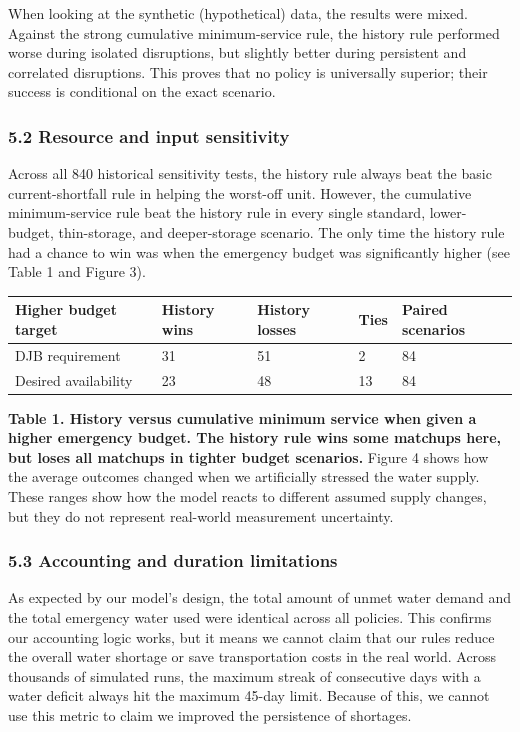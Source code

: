 \documentclass[conference]{IEEEtran}
\begin{document}
When looking at the synthetic (hypothetical) data, the results were mixed. Against the strong cumulative minimum-service rule, the history rule performed worse during isolated disruptions, but slightly better during persistent and correlated disruptions. This proves that no policy is universally superior; their success is conditional on the exact scenario.

\subsubsection{5.2 Resource and input sensitivity}
Across all 840 historical sensitivity tests, the history rule always beat the basic current-shortfall rule in helping the worst-off unit. However, the cumulative minimum-service rule beat the history rule in every single standard, lower-budget, thin-storage, and deeper-storage scenario. The only time the history rule had a chance to win was when the emergency budget was significantly higher (see Table 1 and Figure 3).

\begin{table}[t]
\centering
\begin{tabular}{lllll}
\toprule
Higher budget target & History wins & History losses & Ties & Paired scenarios \\
\midrule
DJB requirement & 31 & 51 & 2 & 84 \\
Desired availability & 23 & 48 & 13 & 84 \\
\bottomrule
\end{tabular}
\end{table}
\textbf{Table 1. History versus cumulative minimum service when given a higher emergency budget. The history rule wins some matchups here, but loses all matchups in tighter budget scenarios.}
Figure 4 shows how the average outcomes changed when we artificially stressed the water supply. These ranges show how the model reacts to different assumed supply changes, but they do not represent real-world measurement uncertainty.

\subsubsection{5.3 Accounting and duration limitations}
As expected by our model's design, the total amount of unmet water demand and the total emergency water used were identical across all policies. This confirms our accounting logic works, but it means we cannot claim that our rules reduce the overall water shortage or save transportation costs in the real world. Across thousands of simulated runs, the maximum streak of consecutive days with a water deficit always hit the maximum 45-day limit. Because of this, we cannot use this metric to claim we improved the persistence of shortages.
\end{document}
